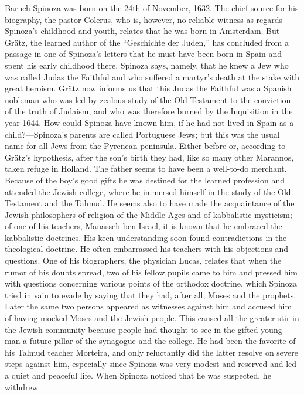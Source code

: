 \documentclass[12pt]{book}
\newcommand{\opage}[1]{\marginnote{\footnotesize\textit{[#1]}}}
\begin{document}
Baruch Spinoza was born on the 24th of November, 1632. The chief source for his
biography, the pastor Colerus, who is, however, no reliable witness as regards
Spinoza's childhood and youth, relates that he was born in Amsterdam. But Grätz, the
learned author of the ``Geschichte der Juden,'' has concluded from a passage in one
of Spinoza's letters that he must have been born in Spain and spent his early
childhood there. Spinoza \opage{22}says, namely, that he knew a Jew who was called
Judas the Faithful and who suffered a martyr's death at the stake with great heroism.
Grätz now informs us that this Judas the Faithful was a Spanish nobleman who was led
by zealous study of the Old Testament to the conviction of the truth of Judaism, and
who was therefore burned by the Inquisition in the year 1644. How could Spinoza have
known him, if he had not lived in Spain as a child?---Spinoza's parents are called
Portuguese Jews; but this was the usual name for all Jews from the Pyrenean
peninsula. Either before or, according to Grätz's hypothesis, after the son's birth
they had, like so many other Marannos, taken refuge in Holland. The father seems to
have been a well-to-do merchant. Because of the boy's good gifts he was destined for
the learned profession and attended the Jewish college, where he immersed himself in
the study of the Old Testament and the Talmud. He seems also to have made the
acquaintance of the Jewish philosophers of religion of the Middle Ages and of
kabbalistic mysticism; of one of his teachers, Manasseh ben Israel, it is known that
he embraced the kabbalistic doctrines. His keen understanding soon found
contradictions in the theological doctrine. He often embarrassed his teachers with
his objections and questions. One of his biographers, the physician Lucas, relates
that when the rumor of his doubts spread, two of his fellow pupils came to him and
pressed him with questions concerning various points of the orthodox doctrine, which
Spinoza tried in vain to evade by saying that they had, after all, Moses and the
prophets. Later \opage{23}the same two persons appeared as witnesses against him and
accused him of having mocked Moses and the Jewish people. This caused all the
greater stir in the Jewish community because people had thought to see in the gifted
young man a future pillar of the synagogue and the college. He had been the favorite
of his Talmud teacher Morteira, and only reluctantly did the latter resolve on severe
steps against him, especially since Spinoza was very modest and reserved and led a
quiet and peaceful life. When Spinoza noticed that he was suspected, he withdrew
\end{document}
